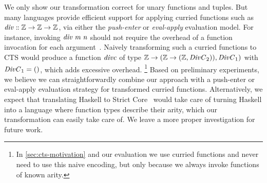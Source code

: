 \label{sec:nary-abstraction}
We only show our transformation correct for unary functions and tuples. But many
languages provide efficient support for applying curried functions such as \ensuremath{\Varid{div}\mathrel{:\mkern-1mu:}\mathbb{Z}\to \mathbb{Z}\to \mathbb{Z}}, via either the \emph{push-enter} or \emph{eval-apply} evaluation
model. For instance, invoking \ensuremath{\Varid{div}\;\Varid{m}\;\Varid{n}} should not require the overhead of a
function invocation for each argument~\citep{Marlow2006making}. Naively
transforming such a curried functions to CTS would produce a function \ensuremath{\Varid{divc}} of
type \ensuremath{\mathbb{Z}\to (\mathbb{Z}\to (\mathbb{Z},\Conid{DivC}_{2})),\Conid{DivC}_{1})} with \ensuremath{\Conid{DivC}_{1}\mathrel{=}()}, which adds
excessive overhead.%
\footnote{In \cref{sec:cts-motivation} and our evaluation we use curried functions
and never need to use this naive encoding, but only because we always invoke
functions of known arity.}
Based on preliminary experiments, we believe we can straightforwardly combine our
approach with a push-enter or eval-apply evaluation strategy for
transformed curried functions. Alternatively, we expect that translating
Haskell to Strict Core~\citep{Bolingbroke2009types} would take care of turning
Haskell into a language where function types describe their arity, which our
transformation can easily take care of.
We leave a more proper investigation for future work.

